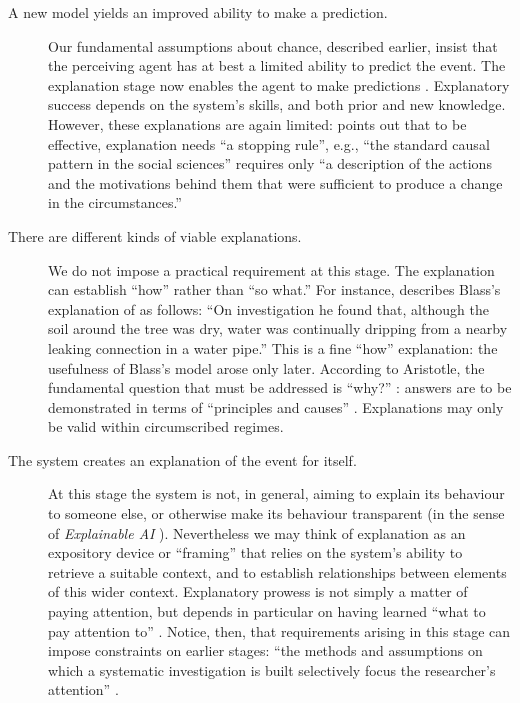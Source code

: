 \begin{description}
\item[A new model yields an improved ability to make a prediction.]  Our
  fundamental assumptions about chance, described earlier, insist that
  the perceiving agent has at best a limited ability to predict the event.
  The explanation stage now enables the agent to make predictions
  \cite[p.~389]{sowa2000knowledge}.  Explanatory success depends on
  the system's skills, and both prior and new knowledge.  However,
  these explanations are again limited:
  \citet[p.~101]{swirski2000between} points out that to be effective,
  explanation needs ``a stopping rule'', e.g., ``the standard causal
  pattern in the social sciences'' requires only ``a description of
  the actions and the motivations behind them that were sufficient to
  produce a change in the circumstances.''
\item[There are different kinds of viable explanations.] We do not
  impose a practical requirement at this stage.  The explanation can
  establish ``how'' rather than ``so what.''  For instance,
  \citet{van1994anatomy} describes Blass's explanation of as follows:
  ``On investigation he found that, although the soil around the tree
  was dry, water was continually dripping from a nearby leaking
  connection in a water pipe.''  This is a fine ``how'' explanation:
  the usefulness of Blass's model arose only later.  According to
  Aristotle, the fundamental question that must be addressed is
  ``why?''  \cite{sep-aristotle-causality}: answers are to be
  demonstrated in terms of ``principles and causes'' \cite[Book Gamma,
    p.~81]{lawson1998metaphysics}.  Explanations may only be valid
  within circumscribed regimes.
\item[The system creates an explanation of the event for itself.]  At
  this stage the system is not, in general, aiming to explain its
  behaviour to someone else, or otherwise make its behaviour transparent
  (in the sense of \emph{Explainable AI}
  \cite{lane2005explainable}).  Nevertheless we may think of
  explanation as an expository device or ``framing''
  \cite{pease2011computational} that relies on the system's ability to
  retrieve a suitable context, and to establish relationships between
  elements of this wider context.  Explanatory prowess is not simply a
  matter of paying attention, but depends in particular on having
  learned ``what to pay attention to'' \cite[p.~4]{levin1975bateson}.
  Notice, then, that requirements arising in this stage can impose
  constraints on earlier stages: ``the methods and assumptions
  on which a systematic investigation is built selectively focus the
  researcher's attention''
  \cite[p.~131]{floppyearedrabbits1958barber}.
\end{description}
                                         
